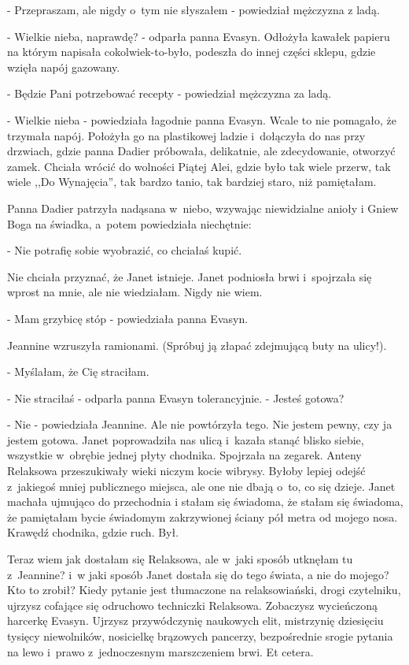 \documentclass[oneside,polish,12pt,sfheadings]{mwbk}
\begin{document}
- Przepraszam, ale nigdy o~tym nie słyszałem - powiedział mężczyzna
z ladą.

- Wielkie nieba, naprawdę? - odparła panna Evasyn. Odłożyła kawałek
papieru na którym napisała cokolwiek-to-było, podeszła do innej części
sklepu, gdzie wzięła napój gazowany.

- Będzie Pani potrzebować recepty - powiedział mężczyzna za ladą.

- Wielkie nieba - powiedziała łagodnie panna Evasyn. Wcale to nie
pomagało, że trzymała napój. Położyła go na plastikowej ladzie i~dołączyła
do nas przy drzwiach, gdzie panna Dadier próbowała, delikatnie, ale
zdecydowanie, otworzyć zamek. Chciała wrócić do wolności Piątej Alei,
gdzie było tak wiele przerw, tak wiele ,,Do Wynajęcia'', tak bardzo
tanio, tak bardziej staro, niż pamiętałam.

Panna Dadier patrzyła nadąsana w~niebo, wzywając niewidzialne anioły
i Gniew Boga na świadka, a~potem powiedziała niechętnie: 

- Nie potrafię sobie wyobrazić, co chciałaś kupić. 

Nie chciała przyznać, że Janet
istnieje. Janet podniosła brwi i~spojrzała się wprost na mnie, ale
nie wiedziałam. Nigdy nie wiem.

- Mam grzybicę stóp - powiedziała panna Evasyn.

Jeannine wzruszyła ramionami. (Spróbuj ją złapać zdejmującą buty na
ulicy!). 

- Myślałam, że Cię straciłam.

- Nie straciłaś - odparła panna Evasyn tolerancyjnie. - Jesteś gotowa?

- Nie - powiedziała Jeannine. Ale nie powtórzyła tego. Nie jestem
pewny, czy ja jestem gotowa. Janet poprowadziła nas ulicą i~kazała
stanąć blisko siebie, wszystkie w~obrębie jednej płyty chodnika. Spojrzała
na zegarek. Anteny Relaksowa przeszukiwały wieki niczym kocie wibrysy.
Byłoby lepiej odejść z~jakiegoś mniej publicznego miejsca, ale one
nie dbają o~to, co się dzieje. Janet machała ujmująco do przechodnia
i stałam się świadoma, że stałam się świadoma, że pamiętałam bycie
świadomym zakrzywionej ściany pół metra od mojego nosa. Krawędź chodnika,
gdzie ruch. Był.

Teraz wiem jak dostałam się Relaksowa, ale w~jaki sposób utknęłam
tu z~Jeannine? i~w jaki sposób Janet dostała się do tego świata, a
nie do mojego? Kto to zrobił? Kiedy pytanie jest tłumaczone na relaksowiański,
drogi czytelniku, ujrzysz cofające się odruchowo techniczki Relaksowa.
Zobaczysz wycieńczoną harcerkę Evasyn. Ujrzysz przywódczynię naukowych
elit, mistrzynię dziesięciu tysięcy niewolników, nosicielkę brązowych
pancerzy, bezpośrednie srogie pytania na lewo i~prawo z~jednoczesnym
marszczeniem brwi. Et cetera.
\end{document}
